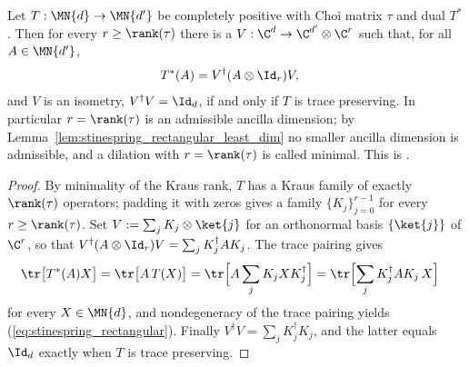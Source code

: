 \begin{theorem}
    \label{thm:stinespring_rectangular}
    \leanok
    Let $T:\MN{d}\to\MN{d'}$ be completely positive with Choi matrix $\tau$ and
    dual $T^*$. Then for every $r\geq\rank(\tau)$ there is a
    $V:\C^{d}\to\C^{d'}\otimes\C^{r}$ such that, for all $A\in\MN{d'}$,
    \begin{align}
        T^*(A)&=V^\dagger(A\otimes\Id_r)V,
        \label{eq:stinespring_rectangular}
    \end{align}
    and $V$ is an isometry, $V^\dagger V=\Id_d$, if and only if $T$ is trace
    preserving. In particular $r=\rank(\tau)$ is an admissible ancilla
    dimension; by Lemma~\ref{lem:stinespring_rectangular_least_dim} no smaller
    ancilla dimension is admissible, and a dilation with $r=\rank(\tau)$ is
    called minimal. This is \cite[Theorem~2.2]{Wolf2012Quantum}.
\end{theorem}

\begin{proof}
    \leanok
    By minimality of the Kraus rank, $T$ has a Kraus family of exactly
    $\rank(\tau)$ operators; padding it with zeros gives a family
    $\{K_j\}_{j=0}^{r-1}$ for every $r\geq\rank(\tau)$. Set
    $V:=\sum_j K_j\otimes\ket{j}$ for an orthonormal basis $\{\ket{j}\}$ of
    $\C^{r}$, so that $V^\dagger(A\otimes\Id_r)V=\sum_j K_j^\dagger AK_j$. The
    trace pairing gives
    \begin{align}
        \tr\bigl[T^*(A)X\bigr]
        &=\tr\bigl[A\,T(X)\bigr]
          =\tr\Bigl[A\sum_j K_jXK_j^\dagger\Bigr]
          =\tr\Bigl[\sum_j K_j^\dagger AK_j\,X\Bigr]
        \label{eq:stinespring_rectangular_pairing}
    \end{align}
    for every $X\in\MN{d}$, and nondegeneracy of the trace pairing yields
    (\ref{eq:stinespring_rectangular}). Finally
    $V^\dagger V=\sum_j K_j^\dagger K_j$, and the latter equals $\Id_d$
    exactly when $T$ is trace preserving.
\end{proof}

